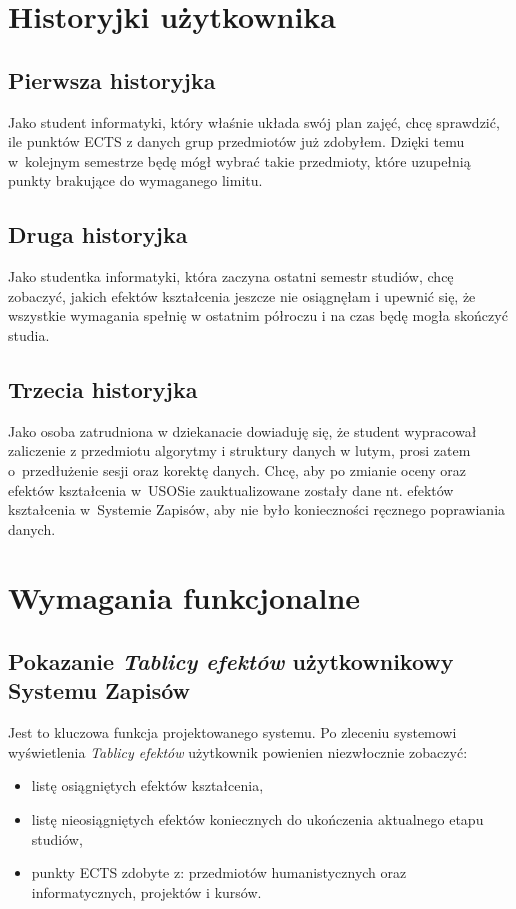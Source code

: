 \documentclass{article}
\begin{document}
\section{Historyjki użytkownika}
\subsection{Pierwsza historyjka}
Jako student informatyki, który właśnie układa swój plan zajęć, chcę sprawdzić, ile punktów ECTS z danych grup przedmiotów już zdobyłem. Dzięki temu w~kolejnym semestrze 
będę mógł wybrać takie przedmioty, które uzupełnią punkty brakujące do wymaganego limitu.
\subsection{Druga historyjka}
Jako studentka informatyki, która zaczyna ostatni semestr studiów, chcę zobaczyć, jakich efektów kształcenia jeszcze nie osiągnęłam i
upewnić się, że wszystkie wymagania spełnię w ostatnim półroczu i na czas będę mogła skończyć studia.
\subsection{Trzecia historyjka}
Jako osoba zatrudniona w dziekanacie dowiaduję się, że student wypracował zaliczenie z przedmiotu algorytmy 
i struktury danych w lutym, prosi zatem o~przedłużenie sesji oraz korektę danych. 
Chcę, aby po zmianie oceny oraz efektów kształcenia w~USOSie zauktualizowane zostały dane nt. efektów kształcenia w~Systemie Zapisów, aby nie było konieczności ręcznego poprawiania danych.


\section{Wymagania funkcjonalne}

\subsection{Pokazanie \textit{Tablicy efektów} użytkownikowy Systemu Zapisów}
Jest to kluczowa funkcja projektowanego systemu. Po zleceniu systemowi wyświetlenia \textit{Tablicy efektów} użytkownik powienien niezwłocznie zobaczyć:
\begin{itemize}
	\item listę osiągniętych efektów kształcenia,
	\item listę nieosiągniętych efektów koniecznych do ukończenia aktualnego etapu studiów,
	\item punkty ECTS zdobyte z: przedmiotów humanistycznych oraz informatycznych, projektów i kursów.
\end{itemize}
\end{document}
